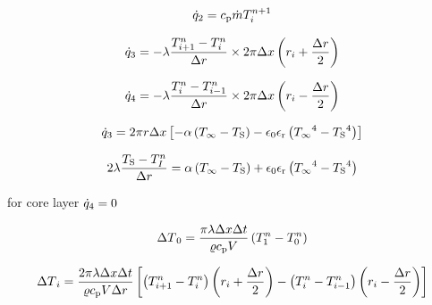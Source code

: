 \documentclass{scrartcl}
\begin{document}
    \begin{equation}
        {\dot{q}}_2 = {c_\mathrm{p}} {\dot{m}} {T}_{{i}}^{{n}+1}
        \label{eq:heat_flow_2}
    \end{equation}

    \begin{equation}
        {\dot{q}}_3 = -{\lambda} \frac{{T}_{{i}+1}^{{n}}-{T}_{{i}}^{{n}}}{{\Delta r}} \times 2 \pi  {\Delta x}\left( {r}_{i} + \frac{{\Delta r}}{2} \right)
        \label{eq:heat_flow_3}
    \end{equation}

    \begin{equation}
        {\dot{q}}_4 = -{\lambda} \frac{{T}_{{i}}^{{n}}-{T}_{{i}-1}^{{n}}}{{\Delta r}} \times 2 \pi  {\Delta x}\left( {r}_{i} - \frac{{\Delta r}}{2} \right)
        \label{eq:heat_flow_4}
    \end{equation}

    \begin{equation}
        {\dot{q}}_3 = 2 \pi {r} {\Delta x} \left[ -{\alpha} \left( {T_\infty} - {T_\mathrm{S}} \right) - {\epsilon_0}{\epsilon_\mathrm{r}}\left( {T_\infty}^4 - {T_\mathrm{S}}^4 \right) \right]
        \label{eq:heat_flow_3_surface}
    \end{equation}

    \begin{equation}
        2 {\lambda} \frac{{T_\mathrm{S}} - {T}_{I}^{n}}{{\Delta r}} = {\alpha} \left( {T_\infty} - {T_\mathrm{S}} \right) + {\epsilon_0}{\epsilon_\mathrm{r}}\left( {T_\infty}^4 - {T_\mathrm{S}}^4 \right)
        \label{eq:surface_temperature}
    \end{equation}

    for core layer ${\dot{q}}_4 = 0$

    \begin{equation}
        {\Delta T}_0 = \frac{\pi {\lambda} {\Delta x} {\Delta t}}{{\varrho}{c_\mathrm{p}}{V}} \left( {T}_1^{n} - {T}_0^{n} \right)
        \label{eq:increment_core}
    \end{equation}

    \begin{equation}
        {\Delta T}_{i} = \frac{2 \pi {\lambda} {\Delta x} {\Delta t}}{{\varrho}{c_\mathrm{p}}{V}{\Delta r}} \left[
            \left( {T}_{{i}+1}^{n} - {T}_{i}^{n} \right)\left( {r}_{i} + \frac{{\Delta r}}{2} \right)
            -\left( {T}_{{i}}^{n} - {T}_{{i}-1}^{n} \right)\left( {r}_{i} - \frac{{\Delta r}}{2} \right)
            \right]
        \label{eq:increment_layer}
    \end{equation}
\end{document}
